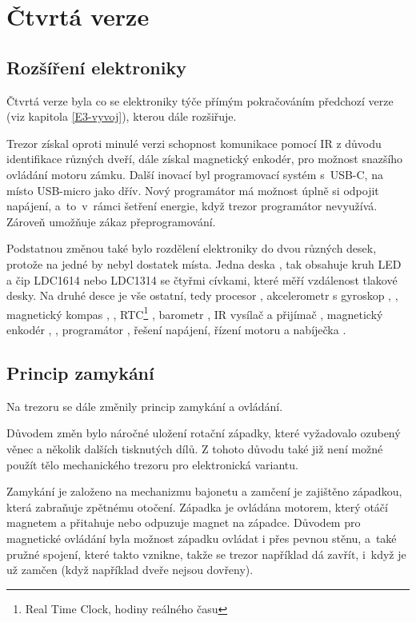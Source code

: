 \section{Čtvrtá verze}
\label{E4-vivoj}

\subsection*{Rozšíření elektroniky}

Čtvrtá verze byla co se elektroniky týče přímým pokračováním předchozí verze (viz kapitola \ref{E3-vyvoj}), kterou dále rozšiřuje.

Trezor získal oproti minulé verzi schopnost komunikace pomocí IR z důvodu identifikace růz\-ných dveří, dále získal magnetický enkodér, pro možnost snaz\-ší\-ho ovládání
motoru zámku. 
Další inovací byl programovací systém s~USB-C, na místo USB-micro jako dřív. Nový programátor má možnost úplně si odpojit napáje\-ní, a~to~v~rámci šetření 
energie, když trezor programátor nevyužívá. 
Zároveň umožňuje zákaz přeprogramování.

Podstatnou změnou také bylo rozdělení elektroniky do dvou různých desek, protože na jedné by nebyl dostatek místa. Jedna deska , 
tak obsahuje kruh LED \parencite{WS2812} a čip LDC1614 \parencite{LDC1614} nebo LDC1314 se čtyřmi cívkami, které měří vzdálenost tlakové desky. Na druhé desce
je vše ostatní, tedy procesor \parencite{ESP32}, akcelerometr s
gyroskop \parencite{bmx055}, \parencite{mpu6050}, magnetický kompas \parencite{bmx055}, \parencite{qmc5883}, RTC\footnote{Real Time Clock, hodiny reálného času} \parencite{m41t62}, 
barometr \parencite{spl06}, IR vysílač \parencite{ir19-21c/tr8} a přijímač \parencite{irm-h936}, magnetický enkodér \parencite{mh253}, \parencite{ss360nt}, programátor \parencite{cp2102},
řešení napájení, řízení motoru a nabíječka \parencite{se9017}. 

\subsection*{Princip zamykání}

Na trezoru se dále změnily princip zamykání a ovládání. 

Důvodem změn bylo náročné uložení rotační západky, 
které vyžadovalo ozubený věnec a několik dalších tisknutých dílů.
Z tohoto důvodu také již není možné použít tělo mechanického trezoru pro elektronická variantu.

Zamykání je založeno na mechanizmu bajonetu a zamčení je zajištěno západ\-kou, která zabraňuje zpětnému otočení.
Západka je ovládána motorem, který otáčí magnetem a přitahuje nebo odpuzuje magnet na západce. Důvodem pro magnetické ovládání
byla možnost západku ovládat i přes pevnou stěnu, a~také pružné spojení, které takto vznikne, takže se trezor například dá zavřít, i~když
je už zamčen (když například dveře nejsou dovřeny).

